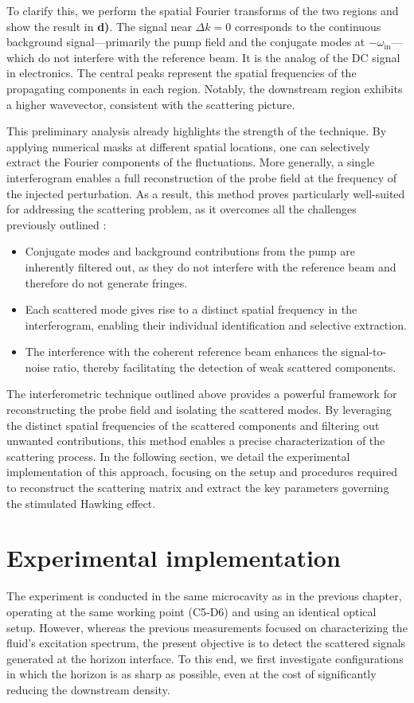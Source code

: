 To clarify this, we perform the spatial Fourier transforms of the two regions and show the result in \textbf{d)}. The signal near \(\Delta k=0\) corresponds to the continuous background signal—primarily the pump field and the conjugate modes at \(-\omega_{\text{in}}\)—which do not interfere with the reference beam. It is the analog of the DC signal in electronics. The central peaks represent the spatial frequencies of the propagating components in each region. Notably, the downstream region exhibits a higher wavevector, consistent with the scattering picture.

This preliminary analysis already highlights the strength of the technique. By applying numerical masks at different spatial locations, one can selectively extract the Fourier components of the fluctuations. More generally, a single interferogram enables a full reconstruction of the probe field at the frequency of the injected perturbation. As a result, this method proves particularly well-suited for addressing the scattering problem, as it overcomes all the challenges previously outlined :



\begin{itemize}
    \item Conjugate modes and background contributions from the pump are inherently filtered out, as they do not interfere with the reference beam and therefore do not generate fringes.
    \item Each scattered mode gives rise to a distinct spatial frequency in the interferogram, enabling their individual identification and selective extraction.
    \item The interference with the coherent reference beam enhances the signal-to-noise ratio, thereby facilitating the detection of weak scattered components.
\end{itemize}


The interferometric technique outlined above provides a powerful framework for reconstructing the probe field and isolating the scattered modes.
 By leveraging the distinct spatial frequencies of the scattered components and filtering out unwanted contributions, this method enables a precise characterization of the scattering process. In the following section, we detail the experimental implementation of this approach, focusing on the setup and procedures required to reconstruct the scattering matrix and extract the key parameters governing the stimulated Hawking effect.

 \section{Experimental implementation}
 The experiment is conducted in the same microcavity as in the previous chapter, operating at the same working point (C5-D6) and using an identical optical setup. 
 However, whereas the previous measurements focused on characterizing the fluid's excitation spectrum, the present objective is to detect the scattered signals generated at the horizon interface. 
 To this end, we first investigate configurations in which the horizon is as sharp as possible, even at the cost of significantly reducing the downstream density. 
\label{sec:exp_implementation_scat_matrix}
